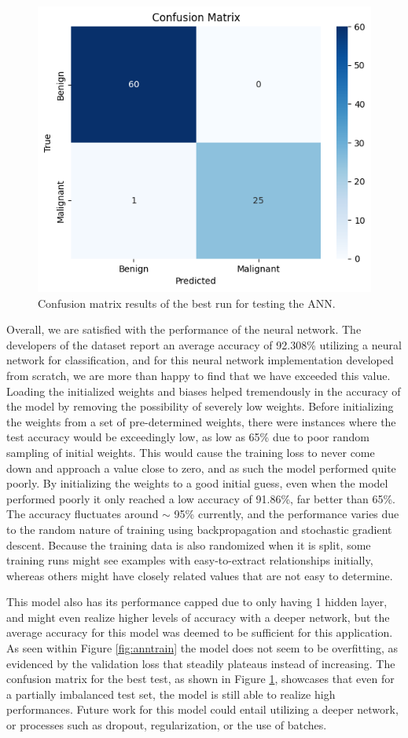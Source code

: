 \documentclass[a4paper]{article}
\begin{document}
\begin{figure}[h]
    \centering
    \includegraphics[width=0.8\linewidth]{images/ANNcm.png}
    \caption{Confusion matrix results of the best run for testing the ANN.}
    \label{fig:anncm}
\end{figure}
\newpage

Overall, we are satisfied with the performance of the neural network. The developers of the dataset report an average accuracy of 92.308\% utilizing a neural network for classification, and for this neural network implementation developed from scratch, we are more than happy to find that we have exceeded this value. Loading the initialized weights and biases helped tremendously in the accuracy of the model by removing the possibility of severely low weights. Before initializing the weights from a set of pre-determined weights, there were instances where the test accuracy would be exceedingly low, as low as 65\% due to poor random sampling of initial weights. This would cause the training loss to never come down and approach a value close to zero, and as such the model performed quite poorly. By initializing the weights to a good initial guess, even when the model performed poorly it only reached a low accuracy of 91.86\%, far better than 65\%. The accuracy fluctuates around $\sim$ 95\% currently, and the performance varies due to the random nature of training using backpropagation and stochastic gradient descent. Because the training data is also randomized when it is split, some training runs might see examples with easy-to-extract relationships initially, whereas others might have closely related values that are not easy to determine.

This model also has its performance capped due to only having 1 hidden layer, and might even realize higher levels of accuracy with a deeper network, but the average accuracy for this model was deemed to be sufficient for this application. As seen within Figure \ref{fig:anntrain} the model does not seem to be overfitting, as evidenced by the validation loss that steadily plateaus instead of increasing. The confusion matrix for the best test, as shown in Figure \ref{fig:anncm}, showcases that even for a partially imbalanced test set, the model is still able to realize high performances. Future work for this model could entail utilizing a deeper network, or processes such as dropout, regularization, or the use of batches.
\end{document}
